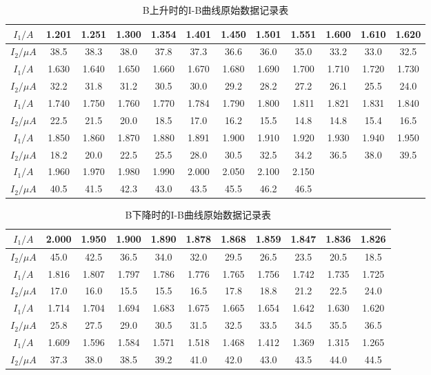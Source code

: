\documentclass[a4paper,UTF8]{ctexart}
\begin{document}
\begin{table}[H]
    \centering
    \begin{tabular}{|c|c|c|c|c|c|c|c|c|c|c|c|}
    \hline
        $I_1/A$ & 1.201 & 1.251 & 1.300 & 1.354 & 1.401 & 1.450 & 1.501 & 1.551 & 1.600 & 1.610 & 1.620 \\ \hline
        $I_2/\mu A$ & 38.5 & 38.3 & 38.0 & 37.8 & 37.3 & 36.6 & 36.0 & 35.0 & 33.2 & 33.0 & 32.5 \\ \hline
        $I_1/A$ & 1.630 & 1.640 & 1.650 & 1.660 & 1.670 & 1.680 & 1.690 & 1.700 & 1.710 & 1.720 & 1.730 \\ \hline
        $I_2/\mu A$ & 32.2 & 31.8 & 31.2 & 30.5 & 30.0 & 29.2 & 28.2 & 27.2 & 26.1 & 25.5 & 24.0 \\ \hline
        $I_1/A$ & 1.740 & 1.750 & 1.760 & 1.770 & 1.784 & 1.790 & 1.800 & 1.811 & 1.821 & 1.831 & 1.840 \\ \hline
        $I_2/\mu A$ & 22.5 & 21.5 & 20.0 & 18.5 & 17.0 & 16.2 & 15.5 & 14.8 & 14.8 & 15.4 & 16.5 \\ \hline
        $I_1/A$ & 1.850 & 1.860 & 1.870 & 1.880 & 1.891 & 1.900 & 1.910 & 1.920 & 1.930 & 1.940 & 1.950 \\ \hline
        $I_2/\mu A$ & 18.2 & 20.0 & 22.5 & 25.5 & 28.0 & 30.5 & 32.5 & 34.2 & 36.5 & 38.0 & 39.5 \\ \hline
        $I_1/A$ & 1.960 & 1.970 & 1.980 & 1.990 & 2.000 & 2.050 & 2.100 & 2.150 &  & ~ & ~ \\ \hline
        $I_2/\mu A$ & 40.5 & 41.5 & 42.3 & 43.0 & 43.5 & 45.5 & 46.2 & 46.5 &  & ~ & ~ \\ \hline
    \end{tabular}
    \caption{B上升时的I-B曲线原始数据记录表}
\end{table}

\begin{table}[H]
    \centering
    \begin{tabular}{|c|c|c|c|c|c|c|c|c|c|c|}
    \hline
        $I_1/A$ & 2.000 & 1.950 & 1.900 & 1.890 & 1.878 & 1.868 & 1.859 & 1.847 & 1.836 & 1.826 \\ \hline
        $I_2/\mu A$ & 45.0 & 42.5 & 36.5 & 34.0 & 32.0 & 29.5 & 26.5 & 23.5 & 20.5 & 18.5 \\ \hline
        $I_1/A$ & 1.816 & 1.807 & 1.797 & 1.786 & 1.776 & 1.765 & 1.756 & 1.742 & 1.735 & 1.725 \\ \hline
        $I_2/\mu A$ & 17.0 & 16.0 & 15.5 & 15.5 & 16.5 & 17.8 & 18.8 & 21.2 & 22.5 & 24.0 \\ \hline
        $I_1/A$ & 1.714 & 1.704 & 1.694 & 1.683 & 1.675 & 1.665 & 1.654 & 1.642 & 1.630 & 1.620 \\ \hline
        $I_2/\mu A$ & 25.8 & 27.5 & 29.0 & 30.5 & 31.5 & 32.5 & 33.5 & 34.5 & 35.5 & 36.5 \\ \hline
        $I_1/A$ & 1.609 & 1.596 & 1.584 & 1.571 & 1.518 & 1.468 & 1.412 & 1.369 & 1.315 & 1.265 \\ \hline
        $I_2/\mu A$ & 37.3 & 38.0 & 38.5 & 39.2 & 41.0 & 42.0 & 43.0 & 43.5 & 44.0 & 44.5 \\ \hline
    \end{tabular}
    \caption{B下降时的I-B曲线原始数据记录表}
\end{table}
\end{document}
